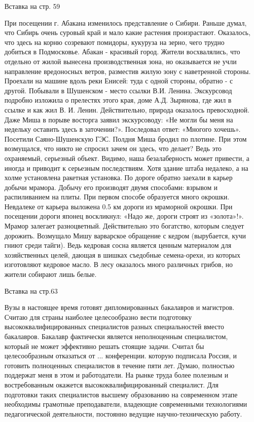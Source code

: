 Вставка на стр. 59

При посещении г. Абакана изменилось представление о Сибири. Раньше думал, что Сибирь очень суровый край и мало какие растения произрастают. Оказалось, что здесь на корню созревают помидоры, кукуруза на зерно, чего трудно добиться в Подмосковье. Абакан - красивый город.  Жители восхвалялись, что отдельно от жилой вынесена производственная зона, но оказывается не учли направление вредоносных ветров, разместив жилую зону с наветренной стороны. Проехали на машине вдоль реки Енисей: туда с одной стороны, обратно - с другой. Побывали в Шушенском - место ссылки В.И. Ленина. Экскурсовод подробно изложила о прелестях этого края, доме А.Д. Зырянова, где жил в ссылке и как жил В. И. Ленин. Действительно, природа оказалось превосходной. Даже Миша в порыве восторга заявил экскурсоводу: «Не могли бы меня на недельку оставить здесь в заточении?». Последовал ответ: «Многого хочешь». Посетили Саяно-Шушенскую ГЭС. Полдня Миша бродил по плотине. При этом возмущался, что никто не спросил зачем он здесь, что делает? Ведь это охраняемый, серьезный объект. Видимо, наша безалаберность может привести, а иногда и приводит к серьезным последствиям. Хотя здание штаба недалеко, а на холме установлена ракетная установка. По дороге обратно заехали в карьер добычи мрамора. Добычу его производят двумя способами: взрывом и распиливанием на плиты. При первом способе образуется много окрошки. Невдалеке от карьера выложена 0.5 км дороги из мраморной окрошки. При посещении дороги японец воскликнул: «Надо же, дороги строят из «золота»!». Мрамор залегает разноцветный. Действительно это богатство, которым следует дорожить. Возмущало Мишу варварское обращение с кедром (вырубается, кучи гниют среди тайги). Ведь кедровая сосна является ценным материалом для хозяйственных целей, дающая в шишках съедобные семена-орехи, из которых изготовляют кедровое масло. В лесу оказалось много различных грибов, но жители собирают лишь белые.

Вставка на стр.63

Вузы в настоящее время готовят дипломированных бакалавров и магистров. Считаю для страны наиболее целесообразно вести подготовку высококвалифицированных специалистов разных специальностей вместо бакалавров. Бакалавр фактически является неполноценным специалистом, который не может эффективно решать стоящие задачи. Считал бы целесообразным отказаться от ... конференции. которую подписала Россия, и готовить полноценных специалистов в течение пяти лет. Думаю, полностью поддержат меня в этом и работодатели. На рынке труда более полезным и востребованным окажется высококвалифицированный специалист. Для подготовки таких специалистов высшему образованию на современном этапе необходимы грамотные преподаватели, владеющие современными технологиями педагогической деятельности, постоянно ведущие научно-техническую работу.

 